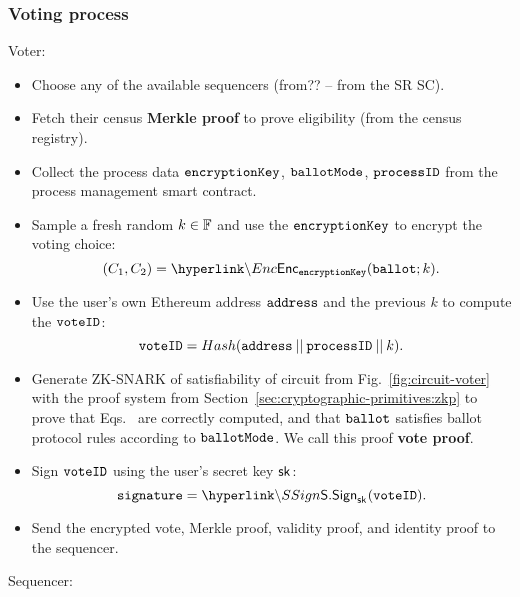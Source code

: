 \subsubsection{Voting process}
\label{sec:vocdoni-protocol:voting}

Voter:

\begin{itemize}
	\item Choose any of the available sequencers (from?? -- from the SR SC).
	\item Fetch their census \textbf{Merkle proof} to prove eligibility (from the census registry).
	\item Collect the process data $\texttt{encryptionKey}$, $\texttt{ballotMode}$, $\texttt{processID}$ from the process management smart contract.
	\item Sample a fresh random $k\in\mathbb{F}$ and use the $\texttt{encryptionKey}$ to encrypt the voting choice: 
		\begin{equation}
		\label{eq-ciphertext}
			(C_1, C_2) = \hlget{\Enc}_{\epk}(\ballot; k).
		\end{equation}
	\item Use the user's own Ethereum address $\texttt{address}$ and the previous $k$ to compute the $\texttt{voteID}$:
		\begin{equation}
		\label{eq-voteid}
			\texttt{voteID} = Hash(\texttt{address} \:||\: \texttt{processID} \:||\: k).
		\end{equation}
	\item Generate ZK-SNARK of satisfiability of circuit from Fig.~\ref{fig:circuit-voter} with the proof system from Section~\ref{sec:cryptographic-primitives:zkp} to prove that Eqs.~ are correctly computed, and that $\texttt{ballot}$ satisfies ballot protocol rules according to $\texttt{ballotMode}$. We call this proof \textbf{vote proof}.
	\item Sign $\texttt{voteID}$ using the user's secret key ${\sf{sk}^{}}$:
		\[ \signature = \hlget{\SSign}_{\sk}(\voteid).\]
	\item Send the encrypted vote, Merkle proof, validity proof, and identity proof to the sequencer.
\end{itemize}

Sequencer:

